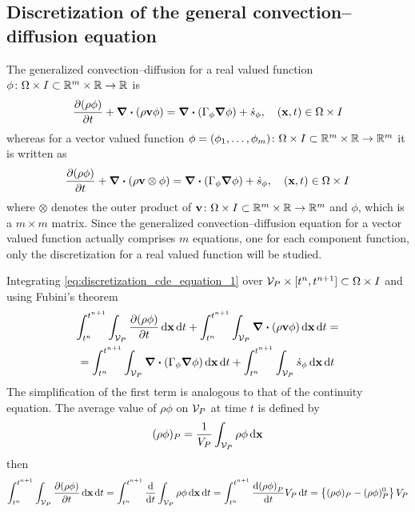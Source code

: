 
\subsection{Discretization of the general convection--diffusion equation}

The generalized convection--diffusion for a real valued function $\phi \colon \Omega \times I \subset \mathbb{R}^m \times \mathbb{R} \rightarrow \mathbb{R}$ is
\begin{equation} \label{eq:discretization_cde_equation_1}
	\pdv{(\rho \phi)}{t} + \div(\rho \vb{v} \phi) = 
	\div(\Gamma_\phi \grad{\phi}) + \dot{s}_\phi,
	\quad (\vb{x}, t) \in \Omega \times I
\end{equation}
whereas for a vector valued function $\phi = (\phi_1, \ldots, \phi_m) \colon \Omega \times I \subset \mathbb{R}^m \times \mathbb{R} \rightarrow \mathbb{R}^m$ it is written as
\begin{equation}
	\pdv{(\rho \phi)}{t} + \div(\rho \vb{v} \otimes \phi) = 
	\div(\Gamma_\phi \grad{\phi}) + \dot{s}_\phi,
	\quad (\vb{x}, t) \in \Omega \times I
\end{equation}
where $\otimes$ denotes the outer product of $\vb{v} \colon \Omega \times I \subset \mathbb{R}^m \times \mathbb{R} \rightarrow \mathbb{R}^m$ and $\phi$, which is a $m \times m$ matrix. Since the generalized convection--diffusion equation for a vector valued function actually comprises $m$ equations, one for each component function, only the discretization for a real valued function will be studied. 

Integrating \eqref{eq:discretization_cde_equation_1} over $\mathcal{V}_{P} \times [t^n, t^{n+1}] \subset \Omega \times I$ and using Fubini's theorem
\begin{multline}
	\int_{t^n}^{t^{n+1}} \int_{\mathcal{V}_{P}} \pdv{(\rho \phi)}{t} \dd{\vb{x}} \dd{t} + 
	\int_{t^n}^{t^{n+1}} \int_{\mathcal{V}_{P}} \div(\rho \vb{v} \phi) \dd{\vb{x}} \dd{t} = \\ = 
	\int_{t^n}^{t^{n+1}} \int_{\mathcal{V}_{P}} \div(\Gamma_\phi \grad{\phi}) \dd{\vb{x}} \dd{t} +
	\int_{t^n}^{t^{n+1}} \int_{\mathcal{V}_{P}} \dot{s}_\phi \dd{\vb{x}} \dd{t}	
\end{multline}
The simplification of the first term is analogous to that of the continuity equation. The average value of $\rho \phi$ on $\mathcal{V}_{P}$ at time $t$ is defined by
\begin{equation}
	(\rho \phi)_P = \frac{1}{V_P} \int_{\mathcal{V}_{P}} \rho \phi \dd{\vb{x}}
\end{equation}
then
\begin{equation}
	\int_{t^n}^{t^{n+1}} \int_{\mathcal{V}_{P}} \pdv{(\rho \phi)}{t} \dd{\vb{x}} \dd{t} = 
	\int_{t^n}^{t^{n+1}} \frac{\dd}{\dd{t}} \int_{\mathcal{V}_{P}} \rho \phi \dd{\vb{x}} \dd{t} =  
	\int_{t^n}^{t^{n+1}} \frac{\dd(\rho \phi)_P}{\dd{t}} V_P \dd{t} = 
	\left\{ (\rho \phi)_P - (\rho \phi)_P^0 \right\} V_P
\end{equation}

